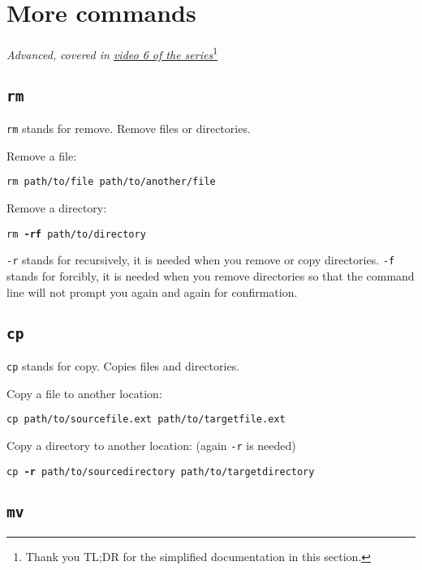 \section{More commands}

\textit{Advanced,}
\textit{covered in \href{https://www.youtube.com/watch?v=U0bDr7b2cOM&list=PLjGmdnqrOKuYXiu7lgG5HW71jPEUd1XCm&index=8}{video 6 of the series}}\footnote{Thank you TL;DR for the simplified documentation in this section.}
\vspace{6mm}

\subsection{\texttt{rm}}

\texttt{rm} stands for remove. Remove files or directories.
\vspace{6mm}

Remove a file: 

\texttt{rm path/to/file path/to/another/file}
\vspace{6mm}

Remove a directory:

\texttt{rm \textbf{-rf} path/to/directory}
\vspace{6mm}

\texttt{-r} stands for recursively, it is needed when you remove or copy directories. \texttt{-f} stands for forcibly, it is needed when you remove directories so that the command line will not prompt you again and again for confirmation.

\subsection{\texttt{cp}}

\texttt{cp} stands for copy. Copies files and directories.
\vspace{6mm}

Copy a file to another location:

\texttt{cp path/to/source\textunderscore file.ext path/to/target\textunderscore file.ext}
\vspace{6mm}

Copy a directory to another location: (again \texttt{-r} is needed)

\texttt{cp \textbf{-r} path/to/source\textunderscore directory path/to/target\textunderscore directory}

\subsection{\texttt{mv}}

